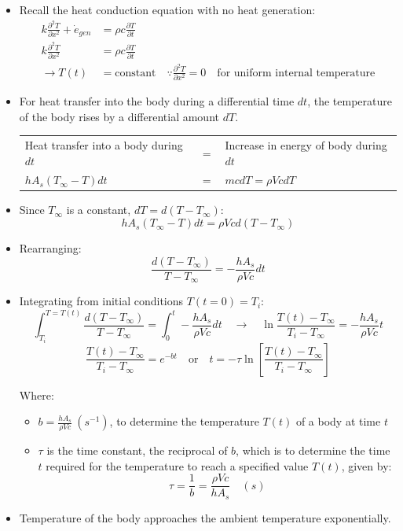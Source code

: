 \documentclass[11pt]{article}
\begin{document}
\begin{itemize}
\item Recall the heat conduction equation with no heat generation:
\begin{align*}
k \frac{\partial^2 T}{\partial x^2} + \dot{e}_{gen} &= \rho c \frac{\partial T}{\partial t} \\
k \frac{\partial^2 T}{\partial x^2} &= \rho c \frac{\partial T}{\partial t} \\
\rightarrow T(t) &= \text{constant} \quad \because \frac{\partial^2 T}{\partial x^2} = 0 \quad \text{for uniform internal temperature}
\end{align*}

 \newpage

\item For heat transfer into the body during a differential time \(dt\), the temperature of the body rises by a differential amount \(dT\).
\begin{center}
\begin{tabular}{>{\centering\arraybackslash}m{15.5em} >{\centering\arraybackslash}m{1em} >{\centering\arraybackslash}m{17em}}
Heat transfer into a body during \(dt\) & \(=\) & Increase in energy of body during \(dt\)\\
\(h A_s (T_{\infty} - T) dt\) & \(=\) & \(mc dT = \rho V c dT\)\\
\end{tabular}
\end{center}
\item Since \(T_{\infty}\) is a constant, \(dT = d(T - T_{\infty})\):
\[hA_s (T_{\infty} - T) dt = \rho V c d(T - T_{\infty})\]
\item Rearranging:
\[\frac{d(T - T_{\infty})}{T - T_{\infty}} = - \frac{h A_s}{\rho V c} dt\]
\item Integrating from initial conditions \(T(t = 0) = T_i\):
\[\int_{T_i}^{T = T(t)} \frac{d(T - T_{\infty})}{T - T_{\infty}} = \int_0^t - \frac{h A_s}{\rho V c} dt \quad \rightarrow \quad \ln \frac{T(t) - T_{\infty}}{T_i - T_{\infty}} = - \frac{h A_s}{\rho V c} t\]
\[\frac{T(t) - T_{\infty}}{T_i - T_{\infty}} = e^{-bt} \quad \text{or} \quad t = - \tau \ln \left[\frac{T(t) - T_{\infty}}{T_i - T_{\infty}} \right]\]

Where:
\begin{itemize}
\item \(b = \frac{h A_s}{\rho V c} \ (\unit{s^{-1}})\), to determine the temperature \(T(t)\) of a body at time \(t\)
\item \(\tau\) is the time constant, the reciprocal of \(b\), which is to determine the time \(t\) required for the temperature to reach a specified value \(T(t)\), given by:
\[\tau = \frac{1}{b} = \frac{\rho V c}{h A_s} \quad (\unit{s})\]
\end{itemize}

 \newpage

\item Temperature of the body approaches the ambient temperature exponentially.
\end{itemize}
\end{document}
